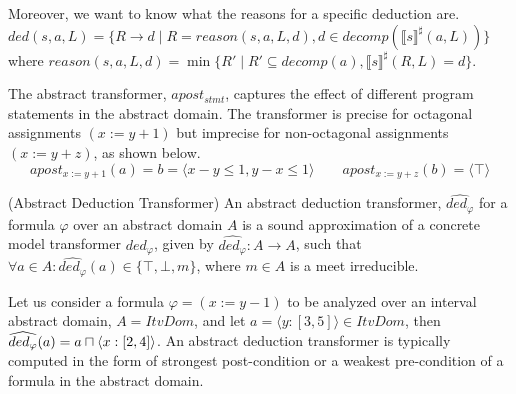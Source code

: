 Moreover, we want to know what the reasons for a specific deduction are.
$ded(s,a,L)=\{R\rightarrow d\mid R=reason(s,a,L,d), d \in decomp(\llbracket s \rrbracket^\sharp(a,L))\}$
where 
$reason(s,a,L,d)=\min \{R'\mid R'\subseteq decomp(a), \llbracket s\rrbracket^\sharp(R,L)=d\}$.


The abstract transformer, $apost_{stmt}$, captures the effect of different program 
statements in the abstract domain. The transformer is precise for octagonal 
assignments $(x:=y+1)$ but imprecise for non-octagonal assignments $(x:=y+z)$, 
as shown below.
\[apost_{x:=y+1}(a) = b = \langle x-y \leq 1, y-x \leq 1 \rangle \qquad apost_{x:=y+z}(b) = \langle \top \rangle \]  

\begin{definition}{(Abstract Deduction Transformer)} An abstract deduction
transformer, $\widehat{ded_{\varphi}}$ for a formula $\varphi$ over an abstract 
domain $A$ is a sound approximation of a concrete model transformer
$ded_{\varphi}$, given by $\widehat{ded_{\varphi}} : A \rightarrow A$, such that 
$\forall a \in A: \widehat{ded_{\varphi}}(a) \in \{\top, \bot, m\}$, where 
$m \in A$ is a meet irreducible.   
\end{definition}

Let us consider a formula $\varphi = (x:=y-1)$ to be analyzed over 
an interval abstract domain, $A = ItvDom$, and let $a = \langle y:[3, 5]
\rangle \in ItvDom$, then $\widehat{ded_{\varphi}}(a) = a \sqcap \langle x:[2, 4]
\rangle$.  An abstract deduction transformer is typically computed in the form 
of strongest post-condition or a weakest pre-condition of a formula in the 
abstract domain.  
 
%
%

